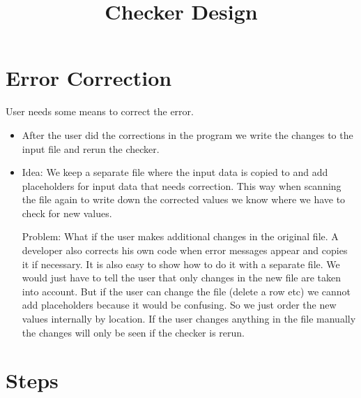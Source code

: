 \documentclass[11pt]{article}
\begin{document}
\title{Checker Design}
\maketitle


\section{Error Correction}

User needs some means to correct the error. 

\begin{itemize}
  \item After the user did the corrections in the program we write the changes to the input file and rerun the checker.
  \item Idea: We keep a separate file where the input data is copied to and add placeholders for input data that needs correction. This way when scanning the file again to write down the corrected values we know where we have to check for new values.
  
  Problem: What if the user makes additional changes in the original file. A developer also corrects his own code when error messages appear and copies it if necessary. It is also easy to show how to do it with a separate file. We would just have to tell the user that only changes in the new file are taken into account. But if the user can change the file (delete a row etc) we cannot add placeholders because it would be confusing. So we just order the new values internally by location. If the user changes anything in the file manually the changes will only be seen if the checker is rerun.
\end{itemize}


\section{Steps}
\end{document}
